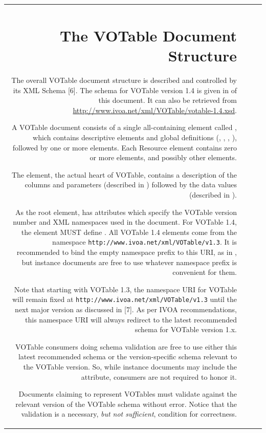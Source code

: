 \begin{tabular}{RRCp{0.8\textwidth}}
\begin{center}
\section{The VOTable Document Structure}
\label{elem:VOTABLE}

The overall VOTable document structure is described and controlled
by its XML Schema [6].  The schema for VOTable version 1.4 is
given in  of this document.  It can also
be retrieved from \url{http://www.ivoa.net/xml/VOTable/votable-1.4.xsd}.

A VOTable document consists of a single all-containing element
called {}, which contains descriptive elements and global definitions
({}, , , ),
followed by one or more {} elements.
Each Resource element contains zero or more  elements,
and possibly other  elements. 

The  element, the actual heart of VOTable, contains 
a description of the columns and parameters 
(described in )
followed by the data values 
(described in ).

As the root element,  has attributes which specify the VOTable version 
number and XML namespaces used in the document. For VOTable 1.4, the 
element MUST define .  All VOTable 1.4 elements come from the 
namespace \nolinkurl{http://www.ivoa.net/xml/VOTable/v1.3}.  It is recommended to bind
the empty namespace prefix to this URI, as in
, but instance
documents are free to use whatever namespace prefix is convenient for them.

Note that starting with VOTable 1.3, the namespace URI for VOTable will
remain fixed at \nolinkurl{http://www.ivoa.net/xml/VOTable/v1.3}
until the next major version as discussed in [7].  As per IVOA
recommendations, this namespace URI will always redirect to the latest
recommended schema for VOTable version 1.x.  

VOTable consumers doing schema validation
are free to use either this latest recommended schema or the version-specific
schema relevant to the VOTable version. So, while instance documents
may include the  attribute, consumers are not required
to honor it.  

Documents claiming to represent VOTables must validate against the 
relevant version of the VOTable schema without error.  Notice that the 
validation is a necessary, {\em but not sufficient}, condition for correctness.


\end{center}
\end{tabular}
